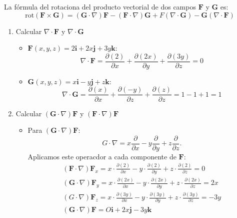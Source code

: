 \begin{enumerate}[label=\color{red}\textbf{\arabic*)}]
\begin{enumerate}[label=\color{red}\textbf{\alph*)}]
      La fórmula del rotaciona del producto vectorial de dos campos $\mathbf{F} $ y $\mathbf{G} $ es: \[
      \mathrm{rot} (\mathbf{F} \times \mathbf{G} )=(\mathbf{G} \cdot \nabla)\mathbf{F} -(\mathbf{F} \cdot \nabla )\mathbf{G} +F(\nabla \cdot \mathbf{G} )-\mathbf{G} (\nabla \cdot \mathbf{F} )
      \] 
      \begin{enumerate}[label=Paso \arabic*:]
        \item Calcular $\nabla \cdot \mathbf{F} $ y $\nabla \cdot \mathbf{G} $ 
          \begin{itemize}[label=\textbullet]
            \item $\mathbf{F} (x,y,z)=2\mathbf{i} +2x\mathbf{j} +3y\mathbf{k} $: \[
            \nabla \cdot \mathbf{F} =\frac{\partial (2)}{\partial x} +\frac{\partial (2x)}{\partial y} +\frac{\partial (3y)}{\partial z} =0
            \] 
          \item $\mathbf{G} (x,y,z)=x\mathbf{i} -y\mathbf{j} +z\mathbf{k} $: \[
          \nabla \cdot \mathbf{G} =\frac{\partial (x)}{\partial x} +\frac{\partial (-y)}{\partial z} +\frac{\partial (z)}{\partial z} =1-1+1=1
          \] 
          \end{itemize}
      \item Calcular $(\mathbf{G} \cdot \nabla )\mathbf{F} $ y $(\mathbf{F} \cdot \nabla )\mathbf{F} $
        \begin{itemize}[label=\textbullet]
          \item Para $(\mathbf{G} \cdot \nabla )\mathbf{F}$: \[
          G\cdot \nabla =x \frac{\partial }{\partial x} -y \frac{\partial }{\partial y} +z \frac{\partial }{\partial z} .
          \] 
          Aplicamos este operacdor a cada componente de $\mathbf{F} $:
          \[
          \begin{array}{c}
            (\mathbf{F} \cdot \nabla)\mathbf{F}_x=x\cdot \frac{\partial (2)}{\partial x} -y\cdot \frac{\partial (2)}{\partial y} +z\cdot \frac{\partial (2)}{\partial z} =0\\
            (\mathbf{G} \cdot \nabla )\mathbf{F} _y=x\cdot \frac{\partial (2x)}{\partial x} -y\cdot \frac{\partial (2x)}{\partial y} +z\cdot \frac{\partial (2x)}{\partial z} =2x\\
            (G\cdot \nabla )\mathbf{F} _z=x\cdot \frac{\partial (3y)}{\partial x} -y\cdot \frac{\partial (3y)}{\partial y} +z\cdot \frac{\partial (3y)}{\partial z} =-3y\\
            (\mathbf{G} \cdot \nabla )\mathbf{F} =O\mathbf{i} +2x\mathbf{j} -3y\mathbf{k} 
          \end{array}
\]
\end{itemize}
\end{enumerate}
\end{enumerate}
\end{enumerate}
